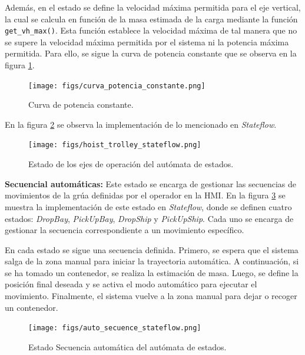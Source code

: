 \documentclass{article}
\begin{document}
            Además, en el estado se define la velocidad máxima permitida para el eje vertical, la cual se calcula en función de la masa estimada de la carga mediante la función \texttt{get\_vh\_max()}. Esta función establece la velocidad máxima de tal manera que no se supere la velocidad máxima permitida por el sistema ni la potencia máxima permitida. Para ello, se sigue la curva de potencia constante que se observa en la figura \ref{fig:potencia_constante}.

            \begin{figure}[H]
                \centering
                \texttt{[image: figs/curva\_potencia\_constante.png]}
                \caption{Curva de potencia constante.}
                \label{fig:potencia_constante}
            \end{figure}

            En la figura \ref{fig:operation_axes_stateflow} se observa la implementación de lo mencionado en \textit{Stateflow}.

            \begin{figure} [H]
                \centering
                \texttt{[image: figs/hoist\_trolley\_stateflow.png]}
                \caption{Estado de los ejes de operación del autómata de estados.}
                \label{fig:operation_axes_stateflow}
            \end{figure}

        \textbf{Secuencial automáticas:}
            Este estado se encarga de gestionar las secuencias de movimientos de la grúa definidas por el operador en la HMI. En la figura \ref{fig:auto_secuence_stateflow} se muestra la implementación de este estado en \textit{Stateflow}, donde se definen cuatro estados: \textit{DropBay}, \textit{PickUpBay}, \textit{DropShip} y \textit{PickUpShip}. Cada uno se encarga de gestionar la secuencia correspondiente a un movimiento específico.

            En cada estado se sigue una secuencia definida. Primero, se espera que el sistema salga de la zona manual para iniciar la trayectoria automática. A continuación, si se ha tomado un contenedor, se realiza la estimación de masa. Luego, se define la posición final deseada y se activa el modo automático para ejecutar el movimiento. Finalmente, el sistema vuelve a la zona manual para dejar o recoger un contenedor.

            \begin{figure} [H]
                \centering
                \texttt{[image: figs/auto\_secuence\_stateflow.png]}
                \caption{Estado Secuencia automática del autómata de estados.}
                \label{fig:auto_secuence_stateflow}
            \end{figure}
\end{document}
